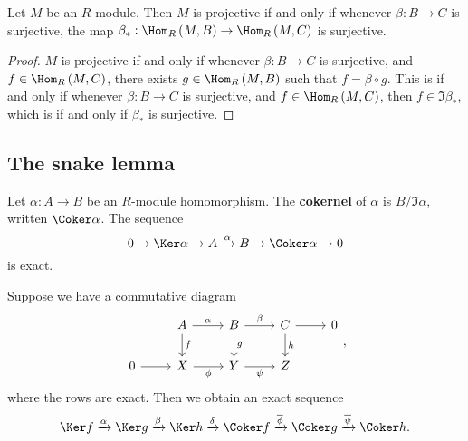 \begin{proposition}
Let $ M $ be an $ R $-module. Then $ M $ is projective if and only if whenever $ \beta : B \to C $ is surjective, the map $ \beta_* : \Hom_R\br{M, B} \to \Hom_R\br{M, C} $ is surjective.
\end{proposition}

\begin{proof}
$ M $ is projective if and only if whenever $ \beta : B \to C $ is surjective, and $ f \in \Hom_R\br{M, C} $, there exists $ g \in \Hom_R\br{M, B} $ such that $ f = \beta \circ g $. This is if and only if whenever $ \beta : B \to C $ is surjective, and $ f \in \Hom_R\br{M, C} $, then $ f \in \Im \beta_* $, which is if and only if $ \beta_* $ is surjective.
\end{proof}

\subsection{The snake lemma}


Let $ \alpha : A \to B $ be an $ R $-module homomorphism. The \textbf{cokernel} of $ \alpha $ is $ B / \Im \alpha $, written $ \Coker \alpha $. The sequence
$$ 0 \to \Ker \alpha \to A \xrightarrow{\alpha} B \to \Coker \alpha \to 0 $$
is exact.

\begin{lemma}
Suppose we have a commutative diagram
$$
\begin{tikzcd}
& A \arrow{r}{\alpha} \arrow{d}{f} & B \arrow{r}{\beta} \arrow{d}{g} & C \arrow{r} \arrow{d}{h} & 0 \\
0 \arrow{r} & X \arrow[swap]{r}{\phi} & Y \arrow[swap]{r}{\psi} & Z &
\end{tikzcd},
$$
where the rows are exact. Then we obtain an exact sequence
$$ \Ker f \xrightarrow{\alpha} \Ker g \xrightarrow{\beta} \Ker h \xrightarrow{\delta} \Coker f \xrightarrow{\overline{\phi}} \Coker g \xrightarrow{\overline{\psi}} \Coker h. $$
\end{lemma}

\pagebreak


